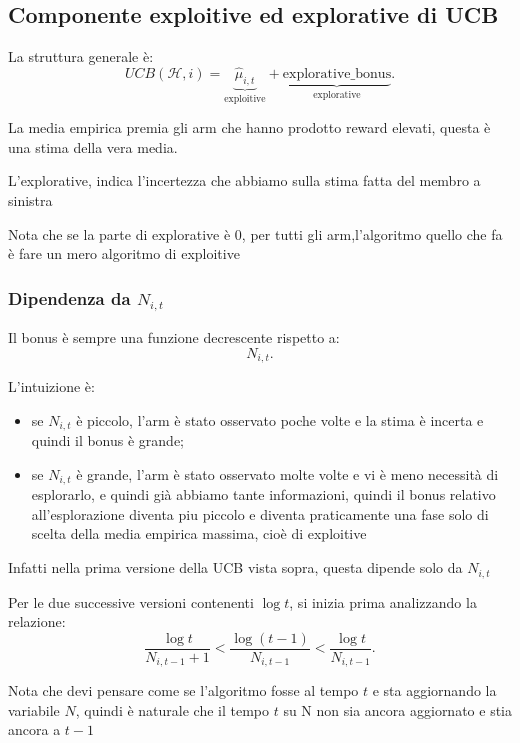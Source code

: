 \subsection{Componente exploitive ed explorative di UCB}

La struttura generale è:
\[
UCB(\mathcal{H},i)
=
\underbrace{\widehat{\mu}_{i,t}}_{\text{exploitive}}
+
\underbrace{\mathrm{explorative\_bonus}}_{\text{explorative}}.
\]

La media empirica premia gli arm che hanno prodotto reward elevati, questa è una stima della vera media.

L'explorative, indica l'incertezza che abbiamo sulla stima fatta del membro a sinistra

\begin{observation}{}
    Nota che se la parte di explorative è 0, per tutti gli arm,l'algoritmo quello che fa è fare un mero algoritmo di exploitive
\end{observation}

\subsubsection{Dipendenza da $N_{i,t}$}

Il bonus è sempre una funzione decrescente rispetto a:
\[
N_{i,t}.
\]

L'intuizione è:
\begin{itemize}
    \item se $N_{i,t}$ è piccolo, l'arm è stato osservato poche volte e la stima è incerta e quindi il bonus è grande;
    \item se $N_{i,t}$ è grande, l'arm è stato osservato molte volte e vi è meno necessità di esplorarlo, e quindi già abbiamo tante informazioni, quindi il bonus relativo all'esplorazione diventa piu piccolo e diventa praticamente una fase solo di scelta della media empirica massima, cioè di exploitive
\end{itemize}

Infatti nella prima versione della UCB vista sopra, questa dipende solo da $N_{i,t}$


Per le due successive versioni contenenti $\log t$, si inizia prima analizzando la relazione:
\[
\frac{\log t}{N_{i,t-1}+1}
<
\frac{\log(t-1)}{N_{i,t-1}}
<
\frac{\log t}{N_{i,t-1}}.
\]

\begin{warning}{}
    Nota che devi pensare come se l'algoritmo fosse al tempo $t$ e sta aggiornando la variabile $N$, quindi è naturale che il tempo $t$ su N non sia ancora aggiornato e stia ancora a $t-1$
\end{warning}


